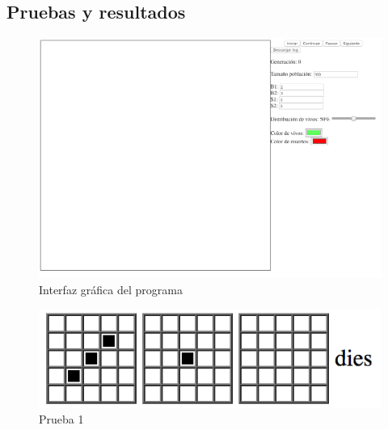\subsection{Pruebas y resultados}

	\begin{figure}[H]
		\begin{center}
			\includegraphics[scale=.3]{GOL/img/interfaz.png}
			\caption{Interfaz gráfica del programa}
			\label{fig:gol1}
		\end{center}
	\end{figure}

	\begin{figure}[H]
		\begin{center}
			\includegraphics[scale=.5]{GOL/img/1.png}
			\caption{Prueba 1}
			\label{fig:gol2}
		\end{center}
	\end{figure}

